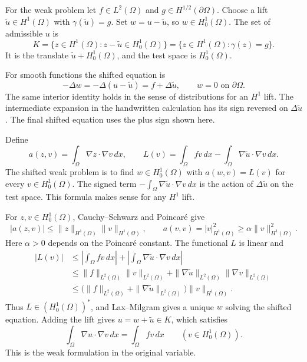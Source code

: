 \documentclass[11pt,a4paper]{article}
\begin{document}
For the weak problem let \(f\in L^2(\Omega)\) and
\(g\in H^{1/2}(\partial\Omega)\). Choose a lift
\(\widetilde u\in H^1(\Omega)\) with \(\gamma(\widetilde u)=g\).
Set \(w=u-\widetilde u\), so \(w\in H_0^1(\Omega)\). The set
of admissible \(u\) is
\[
  K=\{z\in H^1(\Omega):z-\widetilde u\in H_0^1(\Omega)\}
   =\{z\in H^1(\Omega):\gamma(z)=g\}.
\]
It is the translate \(\widetilde u+H_0^1(\Omega)\), and the
test space is \(H_0^1(\Omega)\).

For smooth functions the shifted equation is
\[
  -\Delta w=-\Delta(u-\widetilde u)
           =f+\Delta\widetilde u,\qquad w=0\text{ on }\partial\Omega.
\]
The same interior identity holds in the sense of distributions
for an \(H^1\) lift. The intermediate expansion in the
handwritten calculation has its sign reversed on
\(\Delta\widetilde u\). The final shifted equation uses the plus sign shown here.

Define
\[
  a(z,v)=\int_\Omega \nabla z\cdot\nabla v\,dx,\qquad
  L(v)=\int_\Omega f v\,dx-\int_\Omega\nabla\widetilde u\cdot\nabla v\,dx .
\]
The shifted weak problem is to find \(w\in H_0^1(\Omega)\)
with \(a(w,v)=L(v)\) for every \(v\in H_0^1(\Omega)\).
The signed term \(-\int_\Omega\nabla\widetilde u\cdot\nabla v\,dx\)
is the action of \(\Delta\widetilde u\) on the test space.
This formula makes sense for any \(H^1\) lift.

For \(z,v\in H_0^1(\Omega)\), Cauchy--Schwarz and Poincar\'e
give
\[
  |a(z,v)|\le\|z\|_{H^1(\Omega)}\|v\|_{H^1(\Omega)},\qquad
  a(v,v)=|v|_{H^1(\Omega)}^2\ge\alpha\|v\|_{H^1(\Omega)}^2 .
\]
Here \(\alpha>0\) depends on the Poincar\'e constant. The
functional \(L\) is linear and
\begin{align*}
  |L(v)|
  &\le\left|\int_\Omega f v\,dx\right|+
       \left|\int_\Omega\nabla\widetilde u\cdot\nabla v\,dx\right|\\
  &\le\|f\|_{L^2(\Omega)}\|v\|_{L^2(\Omega)}
        +\|\nabla\widetilde u\|_{L^2(\Omega)}
         \|\nabla v\|_{L^2(\Omega)}\\
  &\le\bigl(\|f\|_{L^2(\Omega)}
        +\|\nabla\widetilde u\|_{L^2(\Omega)}\bigr)\|v\|_{H^1(\Omega)} .
\end{align*}
Thus \(L\in(H_0^1(\Omega))^*\), and Lax--Milgram gives a unique
\(w\) solving the shifted equation. Adding the lift gives
\(u=w+\widetilde u\in K\), which satisfies
\begin{equation}
  \int_\Omega \nabla u\cdot\nabla v\,dx
    =\int_\Omega f v\,dx\qquad(v\in H_0^1(\Omega)).
  \label{eq:l7-dirichlet-weak}
\end{equation}
This is the weak formulation in the original variable.
\end{document}
